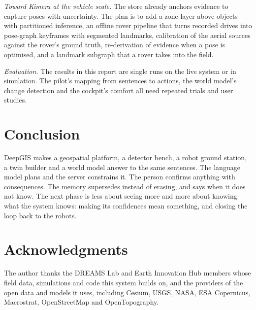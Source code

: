 \documentclass[journal]{IEEEtran}
\begin{document}
\emph{Toward Kimera at the vehicle scale.} The store already anchors evidence to capture poses
with uncertainty. The plan is to add a zone layer above objects with partitioned inference, an
offline rover pipeline that turns recorded drives into pose-graph keyframes with segmented
landmarks, calibration of the aerial sources against the rover's ground truth, re-derivation of
evidence when a pose is optimised, and a landmark subgraph that a rover takes into the field.

\emph{Evaluation.} The results in this report are single runs on the live system or in
simulation. The pilot's mapping from sentences to actions, the world model's change detection and
the cockpit's comfort all need repeated trials and user studies.

\section{Conclusion}
\label{sec:conclusion}

DeepGIS makes a geospatial platform, a detector bench, a robot ground station, a twin builder and a
world model answer to the same sentences. The language model plans and the server constrains it.
The person confirms anything with consequences. The memory supersedes instead of erasing, and says
when it does not know. The next phase is less about seeing more and more about knowing what the
system knows: making its confidences mean something, and closing the loop back to the robots.

\section*{Acknowledgments}
The author thanks the DREAMS Lab and Earth Innovation Hub members whose field data, simulations
and code this system builds on, and the providers of the open data and models it uses, including
Cesium, USGS, NASA, ESA Copernicus, Macrostrat, OpenStreetMap and OpenTopography.
\end{document}
